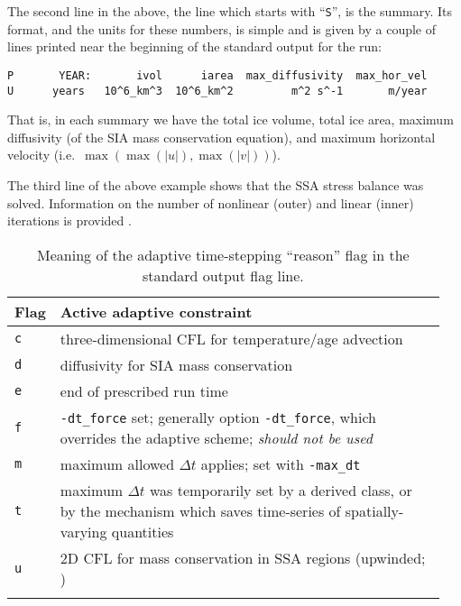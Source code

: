 The second line in the above, the line which starts with ``\verb|S|'', is the summary.  Its format, and the units for these numbers, is simple and is given by a couple of lines printed near the beginning of the standard output for the run:
\small
\begin{verbatim}
P       YEAR:       ivol      iarea  max_diffusivity  max_hor_vel
U      years   10^6_km^3  10^6_km^2         m^2 s^-1       m/year
\end{verbatim}
\normalsize
That is, in each summary we have the total ice volume, total ice area, maximum diffusivity (of the SIA mass conservation equation), and maximum horizontal velocity (i.e.~$\max(\max(|u|), \max(|v|))$).

The third line of the above example shows that the SSA stress balance was solved.  Information on the number of nonlinear (outer) and linear (inner) iterations is provided \cite{BBssasliding}.

\begin{table}[ht]
\centering
\begin{tabular}{p{0.05\linewidth}p{0.9\linewidth}}\toprule
\textbf{Flag} & \textbf{Active adaptive constraint} \\ \midrule
\texttt{c} & three-dimensional CFL for temperature/age advection \cite{BBL} \\
\texttt{d} & diffusivity for SIA mass conservation \cite{BBL,HindmarshPayne} \\
\texttt{e} & end of prescribed run time \\
\texttt{f} & \texttt{-dt_force} set; generally option \texttt{-dt_force}, which overrides the adaptive scheme; \emph{should not be used}  \\
\texttt{m} & maximum allowed $\Delta t$ applies; set with \texttt{-max_dt} \\
\texttt{t} & maximum $\Delta t$ was temporarily set by a derived class, or by the mechanism which saves time-series of spatially-varying quantities \\
\texttt{u} & 2D CFL for mass conservation in SSA regions (upwinded; \cite{BBssasliding})\\
\bottomrule
\normalsize
\end{tabular}
\caption{Meaning of the adaptive time-stepping ``reason'' flag in the standard output flag line.}
\label{tab:adaptiveflag}
\end{table}

